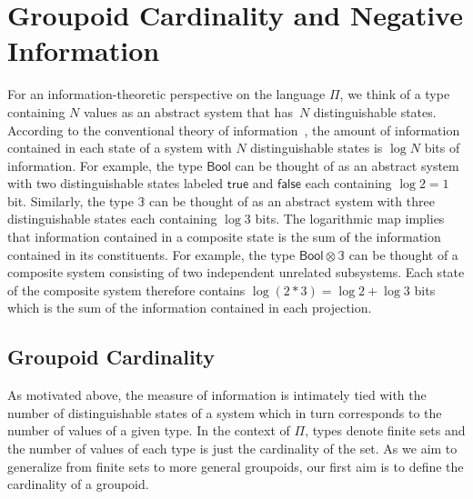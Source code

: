 
\section{Groupoid Cardinality and Negative Information} 

For an information-theoretic perspective on the language $\Pi$, we
think of a type containing $N$ values as an abstract system that
has~$N$ distinguishable states. According to the conventional theory
of information~\cite{Shannon1948}, the amount of information contained
in each state of a system with $N$ distinguishable states is $\log N$
bits of information. For example, the type $\mathsf{Bool}$ can be
thought of as an abstract system with two distinguishable states
labeled $\mathsf{true}$ and $\mathsf{false}$ each containing
$\log 2 = 1$ bit. Similarly, the type $\mathbb{3}$ can be thought of
as an abstract system with three distinguishable states each
containing $\log 3$ bits. The logarithmic map implies that information
contained in a composite state is the sum of the information contained
in its constituents. For example, the type
$\mathsf{Bool} \otimes \mathbb{3}$ can be thought of a composite
system consisting of two independent unrelated subsystems. Each state
of the composite system therefore contains
$\log (2 * 3) = \log 2 + \log 3$ bits which is the sum of the
information contained in each projection.

\subsection{Groupoid Cardinality}

As motivated above, the measure of information is intimately tied with
the number of distinguishable states of a system which in turn
corresponds to the number of values of a given type. In the context of
$\Pi$, types denote finite sets and the number of values of each type
is just the cardinality of the set. As we aim to generalize from
finite sets to more general groupoids, our first aim is to define the
cardinality of a groupoid.

